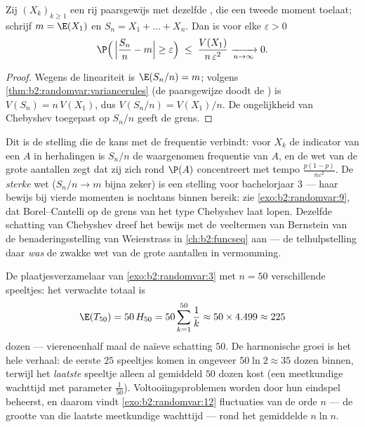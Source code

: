 \begin{theorem}\label{thm:b2:randomvar:lln}
Zij $(X_k)_{k \geq 1}$ een rij paarsgewijs 
 met dezelfde , die een tweede moment
toelaat; schrijf $m = \E(X_1)$ en $S_n = X_1 + \dots + X_n$. Dan is
voor elke $\varepsilon > 0$
\[
\P\Bigl(\,\Bigl|\frac{S_n}{n} - m\Bigr| \geq \varepsilon\Bigr)
\;\leq\; \frac{V(X_1)}{n\,\varepsilon^2}
\xrightarrow[n \to \infty]{} 0 .
\]
\end{theorem}

\begin{proof}
Wegens de lineariteit is $\E(S_n/n) = m$; volgens
\cref{thm:b2:randomvar:variancerules} (de paarsgewijze
 doodt de ) is $V(S_n) = n\,V(X_1)$,
dus $V(S_n/n) = V(X_1)/n$. De ongelijkheid van Chebyshev toegepast
op $S_n/n$ geeft de grens.
\end{proof}

\begin{remark}
Dit is de stelling die de kans met de frequentie verbindt: voor
$X_k$ de indicator van een  $A$ in 
herhalingen is $S_n/n$ de waargenomen frequentie van $A$, en de wet
van de grote aantallen zegt dat zij zich rond $\P(A)$ concentreert
met tempo $\frac{p(1-p)}{n\varepsilon^2}$. De \emph{sterke} wet
($S_n/n \to m$ bijna zeker) is een stelling voor bachelorjaar 3 ---
haar bewijs bij vierde momenten is nochtans binnen bereik: zie
\cref{exo:b2:randomvar:9}, dat Borel--Cantelli op de grens van het
type Chebyshev laat lopen. Dezelfde schatting van Chebyshev dreef
het bewijs met de veeltermen van Bernstein van de
benaderingsstelling van Weierstrass in \cref{ch:b2:funcseq} aan ---
de telhulpstelling daar \emph{was} de zwakke wet van de grote
aantallen in vermomming.
\end{remark}

\begin{example}
\label{ex:b2:randomvar:couponnumeric}
De plaatjesverzamelaar van \cref{exo:b2:randomvar:3} met $n = 50$
verschillende speeltjes: het verwachte totaal is
\[
\E(T_{50}) = 50\,H_{50} = 50\sum_{k=1}^{50}\frac1k
\approx 50 \times 4.499 \approx 225
\]
dozen --- viereneenhalf maal de naïeve schatting $50$. De
harmonische groei is het hele verhaal: de eerste $25$ speeltjes
komen in ongeveer $50\ln2 \approx 35$ dozen binnen, terwijl het
\emph{laatste} speeltje alleen al gemiddeld $50$ dozen kost (een
meetkundige wachttijd met parameter $\frac1{50}$).
Voltooiingsproblemen worden door hun eindspel beheerst, en daarom
vindt \cref{exo:b2:randomvar:12} fluctuaties van de orde $n$ --- de
grootte van die laatste meetkundige wachttijd --- rond het
gemiddelde $n\ln n$.
\end{example}

